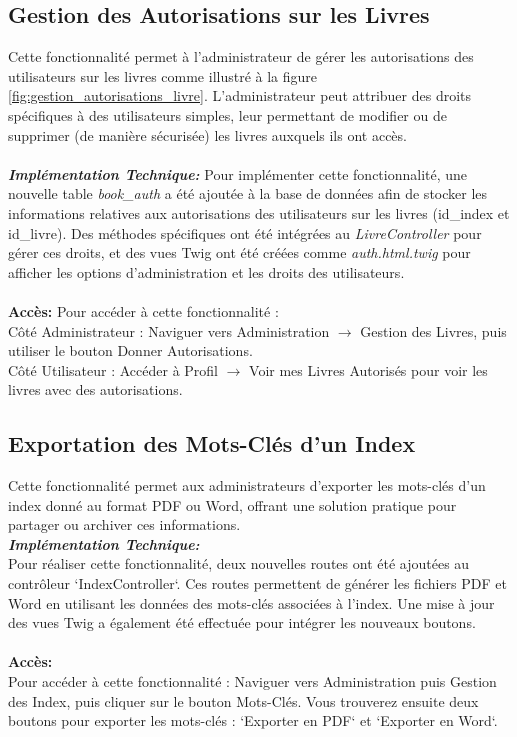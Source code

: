 \documentclass[12pt]{article}
\begin{document}
    \subsection{Gestion des Autorisations sur les Livres}
    Cette fonctionnalité permet à l'administrateur de gérer les autorisations des utilisateurs sur les livres comme illustré à la figure \ref{fig:gestion_autorisations_livre}. L'administrateur peut attribuer des droits spécifiques à des utilisateurs simples, leur permettant de modifier ou de supprimer (de manière sécurisée) les livres auxquels ils ont accès.\\
    \\
    \textit{\textbf{Implémentation Technique:}}
    Pour implémenter cette fonctionnalité, une nouvelle table \textit{book\_auth} a été ajoutée à la base de données afin de stocker les informations relatives aux autorisations des utilisateurs sur les livres (id\_index et id\_livre). Des méthodes spécifiques ont été intégrées au \textit{LivreController} pour gérer ces droits, et des vues Twig ont été créées comme \textit{auth.html.twig} pour afficher les options d'administration et les droits des utilisateurs. \\
    \\
    \textbf{Accès: }
    Pour accéder à cette fonctionnalité : \\
    Côté Administrateur : Naviguer vers Administration $\rightarrow$ Gestion des Livres, puis utiliser le bouton Donner Autorisations.\\
    Côté Utilisateur : Accéder à Profil $\rightarrow$ Voir mes Livres Autorisés pour voir les livres avec des autorisations.

    \subsection{Exportation des Mots-Clés d'un Index}
    Cette fonctionnalité permet aux administrateurs d'exporter les mots-clés d'un index donné au format PDF ou Word, offrant une solution pratique pour partager ou archiver ces informations. \\

    \textit{\textbf{Implémentation Technique:}} \\
    Pour réaliser cette fonctionnalité, deux nouvelles routes ont été ajoutées au contrôleur `IndexController`. Ces routes permettent de générer les fichiers PDF et Word en utilisant les données des mots-clés associées à l'index. Une mise à jour des vues Twig a également été effectuée pour intégrer les nouveaux boutons. \\
    \\
    \textbf{Accès: } \\
    Pour accéder à cette fonctionnalité :
    Naviguer vers Administration puis Gestion des Index, puis cliquer sur le bouton Mots-Clés. Vous trouverez ensuite deux boutons pour exporter les mots-clés : `Exporter en PDF` et `Exporter en Word`.
\end{document}
